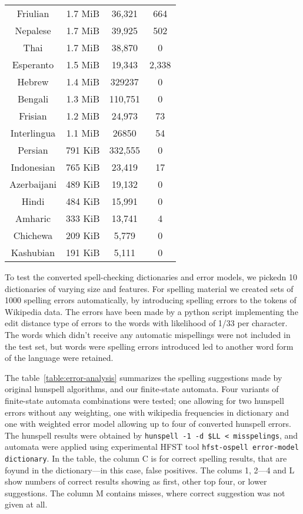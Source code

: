 \documentclass[postprint]{flammie}
\begin{document}
\begin{table}[tbp]
\begin{tabular}{cccc}
    Friulian & 1.7 MiB & 36,321 & 664 \\
    Nepalese & 1.7 MiB & 39,925 & 502 \\
    Thai & 1.7 MiB & 38,870 & 0 \\
    Esperanto & 1.5 MiB & 19,343 & 2,338 \\
    Hebrew & 1.4 MiB & 329237 & 0 \\
    Bengali & 1.3 MiB & 110,751 & 0 \\
    Frisian& 1.2 MiB & 24,973 & 73 \\
    Interlingua & 1.1 MiB & 26850 & 54 \\
    Persian & 791 KiB & 332,555 & 0 \\
    Indonesian & 765 KiB & 23,419 & 17 \\
    Azerbaijani & 489 KiB & 19,132 & 0 \\
    Hindi & 484 KiB & 15,991 & 0 \\
    Amharic & 333 KiB & 13,741 & 4 \\
    Chichewa & 209 KiB & 5,779 & 0 \\
    Kashubian & 191 KiB & 5,111 & 0 \\
    \hline
  \end{tabular}
\end{table}

To test the converted spell-checking dictionaries and error models, we pickedn
10 dictionaries of varying size and features. For spelling material we
created sets of 1000 spelling errors automatically, by introducing spelling
errors to the tokens of Wikipedia data. The errors have been made by a python
script implementing the edit distance type of errors to the words with 
likelihood of 1/33 per character. The words which didn't receive any automatic
mispellings were not included in the test set, but words were spelling errors
introduced led to another word form of the language were retained. 

The table~\ref{table:error-analysis} summarizes the spelling suggestions made
by original hunspell algorithms, and our finite-state automata. Four variants
of finite-state automata combinations were tested; one allowing for two
hunspell errors without any weighting, one with wikipedia frequencies in
dictionary and one with weighted error model allowing up to four of converted
hunspell errors.  The hunspell results were obtained by \texttt{hunspell -1 -d
\$LL < misspelings}, and automata were applied using experimental HFST tool
\texttt{hfst-ospell error-model dictionary}. In the table, the column C is for
correct spelling results, that are foyund in the dictionary---in this case,
false positives.  The colums 1, 2---4 and L show numbers of correct results
showing as first, other top four, or lower suggestions. The column M contains
misses, where correct suggestion was not given at all.
\end{document}
